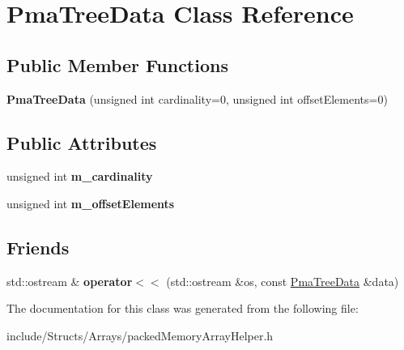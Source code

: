 \hypertarget{class_pma_tree_data}{
\section{PmaTreeData Class Reference}
\label{class_pma_tree_data}
}
\subsection*{Public Member Functions}
\begin{DoxyCompactItemize}
\item 
\hypertarget{class_pma_tree_data_ae858195ed310660a8232040771d7466d}{
{\bfseries PmaTreeData} (unsigned int cardinality=0, unsigned int offsetElements=0)}
\label{class_pma_tree_data_ae858195ed310660a8232040771d7466d}

\end{DoxyCompactItemize}
\subsection*{Public Attributes}
\begin{DoxyCompactItemize}
\item 
\hypertarget{class_pma_tree_data_a37263fd8d845bdee542de2e87222ac02}{
unsigned int {\bfseries m\_\-cardinality}}
\label{class_pma_tree_data_a37263fd8d845bdee542de2e87222ac02}

\item 
\hypertarget{class_pma_tree_data_a119dea859cae638c549d97fa2faa6e3d}{
unsigned int {\bfseries m\_\-offsetElements}}
\label{class_pma_tree_data_a119dea859cae638c549d97fa2faa6e3d}

\end{DoxyCompactItemize}
\subsection*{Friends}
\begin{DoxyCompactItemize}
\item 
\hypertarget{class_pma_tree_data_a29124b211f5e0b886aa4be6c55914341}{
std::ostream \& {\bfseries operator$<$$<$} (std::ostream \&os, const \hyperlink{class_pma_tree_data}{PmaTreeData} \&data)}
\label{class_pma_tree_data_a29124b211f5e0b886aa4be6c55914341}

\end{DoxyCompactItemize}


The documentation for this class was generated from the following file:\begin{DoxyCompactItemize}
\item 
include/Structs/Arrays/packedMemoryArrayHelper.h\end{DoxyCompactItemize}
